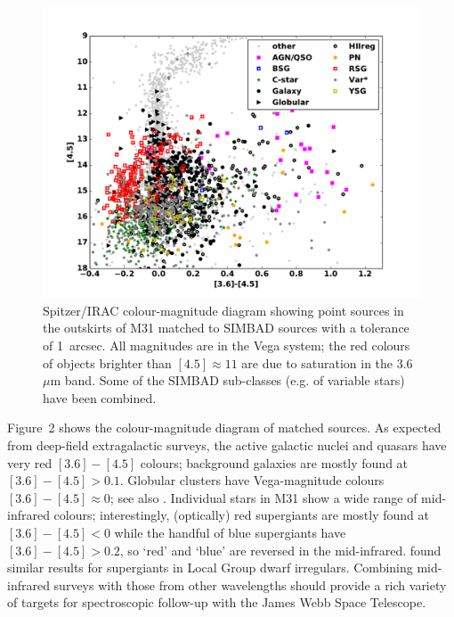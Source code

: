 \documentclass{iau}
\begin{document}
\begin{figure}[t]
\begin{center}
 \includegraphics[width=4.5in]{barmby_iaus321_fig2} 
 \caption{Spitzer/IRAC colour-magnitude diagram showing point sources in the outskirts of M31 matched to SIMBAD
 sources with a tolerance of 1~arcsec. All magnitudes are in the Vega system; the red colours of objects brighter than
 $[4.5]\approx 11$ are due to saturation in the 3.6~$\mu$m band. Some of the SIMBAD sub-classes (e.g. of variable stars)
have been combined.}
   \label{fig2}
\end{center}
\end{figure}

Figure~2 shows the colour-magnitude diagram of matched sources. As expected from deep-field extragalactic surveys,
the active galactic nuclei and quasars have very red $[3.6]-[4.5]$ colours; background galaxies are mostly found at $[3.6]-[4.5]>0.1$.
Globular clusters have Vega-magnitude colours  $[3.6]-[4.5]\approx 0$; see also \cite[Barmby \& Jalilian (2012)]{bj12}.
Individual stars in M31 show a wide range of mid-infrared colours; interestingly, (optically) red supergiants are mostly found at $[3.6]-[4.5]<0$
while the handful of blue supergiants have $[3.6]-[4.5]>0.2$, so `red' and `blue' are reversed in the mid-infrared.
\cite[Britavskiy \etal\ (2015)]{brit15} found similar results for supergiants in Local Group dwarf irregulars.
Combining mid-infrared surveys with those from other wavelengths should provide a rich variety of targets for spectroscopic follow-up
with the James Webb Space Telescope.  
 
\end{document}
